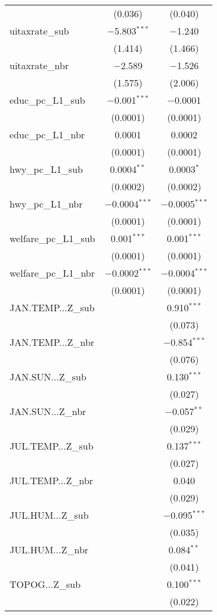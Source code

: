 \begin{table}[!htbp]
\begin{tabular}{@{\extracolsep{5pt}}lcc}
  & (0.036) & (0.040) \\ 
  uitaxrate\_sub & $-$5.803$^{***}$ & $-$1.240 \\ 
  & (1.414) & (1.466) \\ 
  uitaxrate\_nbr & $-$2.589 & $-$1.526 \\ 
  & (1.575) & (2.006) \\ 
  educ\_pc\_L1\_sub & $-$0.001$^{***}$ & $-$0.0001 \\ 
  & (0.0001) & (0.0001) \\ 
  educ\_pc\_L1\_nbr & 0.0001 & 0.0002 \\ 
  & (0.0001) & (0.0001) \\ 
  hwy\_pc\_L1\_sub & 0.0004$^{**}$ & 0.0003$^{*}$ \\ 
  & (0.0002) & (0.0002) \\ 
  hwy\_pc\_L1\_nbr & $-$0.0004$^{***}$ & $-$0.0005$^{***}$ \\ 
  & (0.0001) & (0.0001) \\ 
  welfare\_pc\_L1\_sub & 0.001$^{***}$ & 0.001$^{***}$ \\ 
  & (0.0001) & (0.0001) \\ 
  welfare\_pc\_L1\_nbr & $-$0.0002$^{***}$ & $-$0.0004$^{***}$ \\ 
  & (0.0001) & (0.0001) \\ 
  JAN.TEMP...Z\_sub &  & 0.910$^{***}$ \\ 
  &  & (0.073) \\ 
  JAN.TEMP...Z\_nbr &  & $-$0.854$^{***}$ \\ 
  &  & (0.076) \\ 
  JAN.SUN...Z\_sub &  & 0.130$^{***}$ \\ 
  &  & (0.027) \\ 
  JAN.SUN...Z\_nbr &  & $-$0.057$^{**}$ \\ 
  &  & (0.029) \\ 
  JUL.TEMP...Z\_sub &  & 0.137$^{***}$ \\ 
  &  & (0.027) \\ 
  JUL.TEMP...Z\_nbr &  & 0.040 \\ 
  &  & (0.029) \\ 
  JUL.HUM...Z\_sub &  & $-$0.095$^{***}$ \\ 
  &  & (0.035) \\ 
  JUL.HUM...Z\_nbr &  & 0.084$^{**}$ \\ 
  &  & (0.041) \\ 
  TOPOG...Z\_sub &  & 0.100$^{***}$ \\ 
  &  & (0.022) \\ 

\end{tabular}
\end{table}
